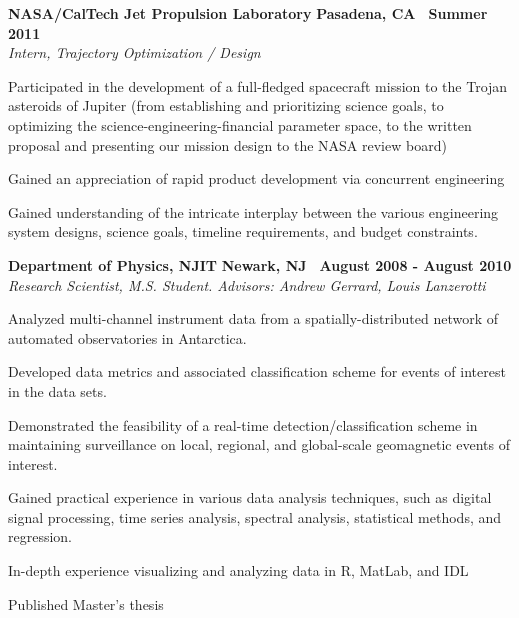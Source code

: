 \documentclass[10pt]{article}
\newcommand{\leftandright}[2]{\noindent\textbf{#1}\hfill
\textbf{#2}}
\begin{document}
\leftandright{NASA/CalTech Jet Propulsion Laboratory}{Pasadena, CA \textbullet\, Summer 2011}\\  
\vspace{-0.8em}
\textit{Intern, Trajectory Optimization / Design} 
\begin{itemize*}
  \item
    Participated in the development of a full-fledged spacecraft mission to
    the Trojan asteroids of Jupiter
    (from %
    establishing and prioritizing science goals, to optimizing the science-engineering-financial
    parameter space, to the written proposal and presenting our mission design to the NASA review
    board)
  \item 
    Gained an appreciation of rapid product development via concurrent engineering
  \item Gained understanding of the intricate interplay between the
    various engineering system designs, science goals, timeline
    requirements, and budget constraints.

\end{itemize*}
   
\leftandright{Department of Physics, NJIT}{Newark, NJ \textbullet\, 
August 2008 - August 2010}\\  
\vspace{-0.8em}
\textit{Research Scientist, M.S. Student. Advisors: Andrew Gerrard,
Louis Lanzerotti} 
\begin{itemize*}
  \item
    Analyzed multi-channel instrument data from a spatially-distributed
    network of automated observatories in Antarctica.
  \item Developed data metrics and associated classification scheme for
    events of interest in the data sets.
  \item Demonstrated the feasibility of a real-time
    detection/classification scheme in maintaining surveillance on
    local, regional, and global-scale geomagnetic events of interest.
  \item Gained practical experience in various data analysis techniques,
    such as digital signal processing, time series analysis, spectral analysis,
    statistical methods, and regression.
  \item In-depth experience visualizing and analyzing data in R, MatLab,
    and IDL
  \item Published Master's thesis
\end{itemize*}
\end{document}
